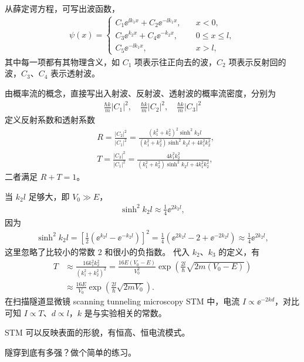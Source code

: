 从薛定谔方程，可写出波函数，
\begin{align}
    \psi(x) = \begin{cases}
        C_1 \ee^{\ii k_1 x} + C_2 \ee^{-\ii k_1 x},\quad &x<0, \\
        C_3 \ee^{k_2 x} + C_4 \ee^{-k_2 x},\quad &0\leqslant x \leqslant l,\\
        C_5 \ee^{-\ii k_1 x}, \quad &x>l,
    \end{cases}
\end{align}
其中每一项都有其物理含义，如 $C_1$ 项表示往正向去的波，$C_2$ 项表示反射回的波，$C_3$、$C_4$ 表示透射波。

由概率流的概念，直接写出入射波、反射波、透射波的概率流密度，分别为
\begin{align}
    \frac{\hbar k}{m} |C_1|^2, \quad \frac{\hbar k}{m} |C_2|^2, \quad \frac{\hbar k}{m} |C_3|^2
\end{align}
定义反射系数和透射系数
\begin{align}
    &R = \frac{|C_2|^2}{|C_1|^2} = 
    \frac{(k_1^2 + k_2^2)^2 \sinh^2  k_2 l} {(k_1^2 + k_2^2) \sinh^2 k_2l + 4 k_1^2 k_2^2}, \\
    &T = \frac{|C_3|^2}{|C_1|^2} = 
    \frac{4 k_1^2 k_2^2} {(k_1^2 + k_2^2) \sinh^2 k_2l + 4 k_1^2 k_2^2},
\end{align}
二者满足 $R+T=1$。

当 $k_2l$ 足够大，即 $V_0 \gg E$，
\begin{align}
    \sinh^2 k_2l \approx \frac 14 \ee^{2k_2 l},
\end{align}
因为
\begin{align}
    \sinh^2 k_2 l = \left[\frac12\left(\ee^{k_2l} - \ee^{-k_2l}\right)\right]^2 = \frac14 \left(\ee^{2k_2 l} - 2 + \ee^{-2k_2 l}\right) \approx \frac 14 \ee^{2k_2 l},
\end{align}
这里忽略了比较小的常数 2 和很小的负指数。
代入 $k_2$、$k_3$ 的定义，有
\begin{align}
    T &\approx \frac{16 k_1^2 k_2^2}{(k_1^2 + k_2^2)^2} = \frac{16E(V_0 - E)}{V_0^2} \exp\left(\frac{2l}{\hbar}\sqrt{2m(V_0 - E)}\right) \\
    &\approx \frac{16 E}{V_0} \exp\left(\frac{2l}{\hbar}\sqrt{2m V_0}\right). 
\end{align}
在扫描隧道显微镜 scanning tunneling microscopy STM 中，电流 $I \propto \ee^{-2 k d}$，对比可知 $I \propto T$、$d\propto l$，$k$ 是与实验相关的常数。

STM 可以反映表面的形貌，有恒高、恒电流模式。

隧穿到底有多强？做个简单的练习。

